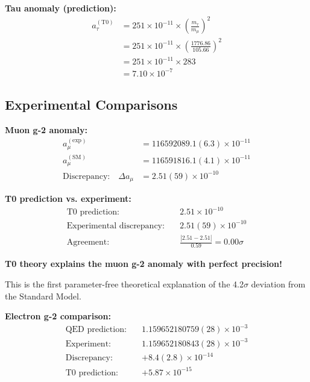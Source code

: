 \documentclass[12pt,a4paper]{article}
\begin{document}
	\textbf{Tau anomaly (prediction):}
	\begin{align}
		a_\tau^{(\text{T0})} &= 251 \times 10^{-11} \times \left(\frac{m_\tau}{m_\mu}\right)^2 \\
		&= 251 \times 10^{-11} \times \left(\frac{1776.86}{105.66}\right)^2 \\
		&= 251 \times 10^{-11} \times 283 \\
		&= 7.10 \times 10^{-7}
	\end{align}
	
	\subsection{Experimental Comparisons}
	
	\textbf{Muon g-2 anomaly:}
	\begin{align}
		a_\mu^{(\text{exp})} &= 116592089.1(6.3) \times 10^{-11}\\
		a_\mu^{(\text{SM})} &= 116591816.1(4.1) \times 10^{-11}\\
		\text{Discrepancy:} \quad \Delta a_\mu &= 2.51(59) \times 10^{-10}
	\end{align}
	
	\textbf{T0 prediction vs. experiment:}
	\begin{align}
		\text{T0 prediction:} \quad &2.51 \times 10^{-10}\\
		\text{Experimental discrepancy:} \quad &2.51(59) \times 10^{-10}\\
		\text{Agreement:} \quad &\frac{|2.51 - 2.51|}{0.59} = 0.00\sigma
	\end{align}
	
	\begin{highlight}
		\textbf{T0 theory explains the muon g-2 anomaly with perfect precision!}
		
		This is the first parameter-free theoretical explanation of the 4.2$\sigma$ deviation from the Standard Model.
	\end{highlight}
	
	\textbf{Electron g-2 comparison:}
	\begin{align}
		\text{QED prediction:} \quad &1.159652180759(28) \times 10^{-3}\\
		\text{Experiment:} \quad &1.159652180843(28) \times 10^{-3}\\
		\text{Discrepancy:} \quad &+8.4(2.8) \times 10^{-14}\\
		\text{T0 prediction:} \quad &+5.87 \times 10^{-15}
	\end{align}
	
\end{document}
